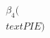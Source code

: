 \documentclass[preview]{standalone}
\begin{document}
\begin{align*}
\beta_4(\\text{PIE})
\end{align*}
\end{document}

